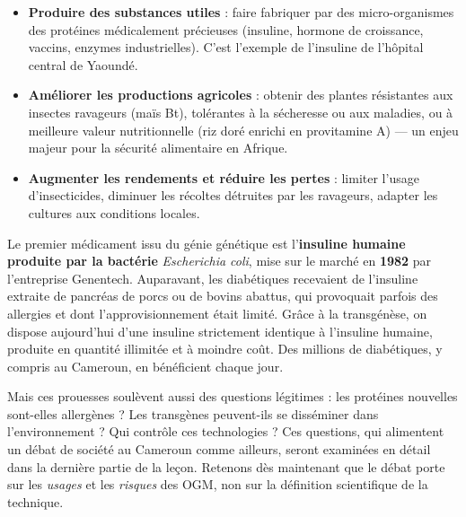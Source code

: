 \documentclass[11pt]{article}
\begin{document}
\begin{itemize}
\item \textbf{Produire des substances utiles} : faire fabriquer par des micro-organismes des protéines médicalement précieuses (insuline, hormone de croissance, vaccins, enzymes industrielles). C'est l'exemple de l'insuline de l'hôpital central de Yaoundé.
\item \textbf{Améliorer les productions agricoles} : obtenir des plantes résistantes aux insectes ravageurs (maïs Bt), tolérantes à la sécheresse ou aux maladies, ou à meilleure valeur nutritionnelle (riz doré enrichi en provitamine A) — un enjeu majeur pour la sécurité alimentaire en Afrique.
\item \textbf{Augmenter les rendements et réduire les pertes} : limiter l'usage d'insecticides, diminuer les récoltes détruites par les ravageurs, adapter les cultures aux conditions locales.
\end{itemize}

\begin{savaistu}
Le premier médicament issu du génie génétique est l'\textbf{insuline humaine produite par la bactérie} \emph{Escherichia coli}, mise sur le marché en \textbf{1982} par l'entreprise Genentech. Auparavant, les diabétiques recevaient de l'insuline extraite de pancréas de porcs ou de bovins abattus, qui provoquait parfois des allergies et dont l'approvisionnement était limité. Grâce à la transgénèse, on dispose aujourd'hui d'une insuline strictement identique à l'insuline humaine, produite en quantité illimitée et à moindre coût. Des millions de diabétiques, y compris au Cameroun, en bénéficient chaque jour.
\end{savaistu}

Mais ces prouesses soulèvent aussi des questions légitimes : les protéines nouvelles sont-elles allergènes ? Les transgènes peuvent-ils se disséminer dans l'environnement ? Qui contrôle ces technologies ? Ces questions, qui alimentent un débat de société au Cameroun comme ailleurs, seront examinées en détail dans la dernière partie de la leçon. Retenons dès maintenant que le débat porte sur les \emph{usages} et les \emph{risques} des OGM, non sur la définition scientifique de la technique.
\end{document}
